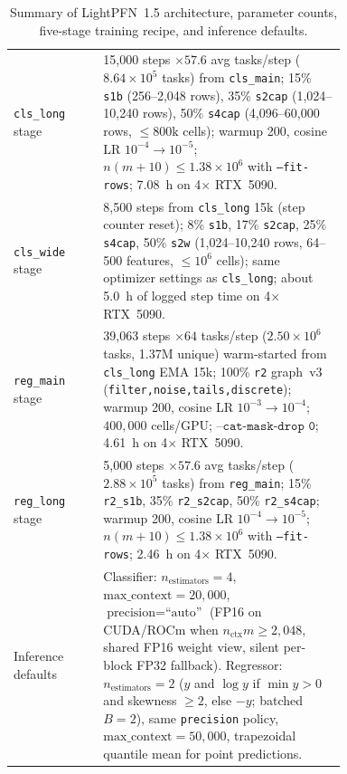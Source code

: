 \documentclass[11pt]{article}
\begin{document}
\begin{table}[h]
\begin{tabular}{lp{0.73\linewidth}}
\texttt{cls\_long} stage & {\raggedright 15,000 steps $\times 57.6$ avg tasks/step ($8.64\times 10^5$ tasks) from \texttt{cls\_main}; 15\% \texttt{s1b} (256--2,048 rows), 35\% \texttt{s2cap} (1,024--10,240 rows), 50\% \texttt{s4cap} (4,096--60,000 rows, $\le 800\text{k}$ cells); warmup 200, cosine LR $10^{-4}\to 10^{-5}$; $n(m+10)\le 1.38\times 10^6$ with \texttt{--fit-rows}; 7.08~h on 4$\times$ RTX~5090.\par} \\
\texttt{cls\_wide} stage & {\raggedright 8,500 steps from \texttt{cls\_long} 15k (step counter reset); 8\% \texttt{s1b}, 17\% \texttt{s2cap}, 25\% \texttt{s4cap}, 50\% \texttt{s2w} (1,024--10,240 rows, 64--500 features, $\le 10^6$ cells); same optimizer settings as \texttt{cls\_long}; about 5.0~h of logged step time on 4$\times$ RTX~5090.\par} \\
\texttt{reg\_main} stage & {\raggedright 39,063 steps $\times 64$ tasks/step ($2.50\times 10^6$ tasks, 1.37M unique) warm-started from \texttt{cls\_long} EMA 15k; 100\% \texttt{r2} graph~v3 (\texttt{filter,noise,tails,discrete}); warmup 200, cosine LR $10^{-3}\to 10^{-4}$; $400{,}000$ cells/GPU; $\texttt{--cat-mask-drop 0}$; 4.61~h on 4$\times$ RTX~5090.\par} \\
\texttt{reg\_long} stage & {\raggedright 5,000 steps $\times 57.6$ avg tasks/step ($2.88\times 10^5$ tasks) from \texttt{reg\_main}; 15\% \texttt{r2\_s1b}, 35\% \texttt{r2\_s2cap}, 50\% \texttt{r2\_s4cap}; warmup 200, cosine LR $10^{-4}\to 10^{-5}$; $n(m+10)\le 1.38\times 10^6$ with \texttt{--fit-rows}; 2.46~h on 4$\times$ RTX~5090.\par} \\
\midrule
Inference defaults & {\raggedright Classifier: $n_{\text{estimators}}=4$, $\text{max\_context}=20{,}000$, $\text{precision}=\text{``auto''}$ (FP16 on CUDA/ROCm when $n_{\text{ctx}}m \ge 2{,}048$, shared FP16 weight view, silent per-block FP32 fallback). Regressor: $n_{\text{estimators}}=2$ ($y$ and $\log y$ if $\min y>0$ and skewness $\ge 2$, else $-y$; batched $B=2$), same \texttt{precision} policy, $\text{max\_context}=50{,}000$, trapezoidal quantile mean for point predictions.\par} \\
\bottomrule
\end{tabular}
\caption{Summary of LightPFN~1.5 architecture, parameter counts, five-stage training recipe, and inference defaults.}
\label{tab:app-hyperparams}
\end{table}
\end{document}
